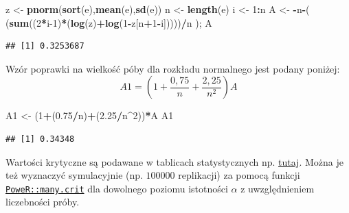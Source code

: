 \documentclass[polish,]{book}
\newenvironment{Shaded}{\begin{snugshade}}{\end{snugshade}}
\newcommand{\DecValTok}[1]{\textcolor[rgb]{0.00,0.00,0.81}{#1}}
\newcommand{\FloatTok}[1]{\textcolor[rgb]{0.00,0.00,0.81}{#1}}
\newcommand{\KeywordTok}[1]{\textcolor[rgb]{0.13,0.29,0.53}{\textbf{#1}}}
\newcommand{\NormalTok}[1]{#1}
\newcommand{\OperatorTok}[1]{\textcolor[rgb]{0.81,0.36,0.00}{\textbf{#1}}}
\newcommand{\StringTok}[1]{\textcolor[rgb]{0.31,0.60,0.02}{#1}}
\begin{document}
\begin{Shaded}
\begin{Highlighting}[]
\NormalTok{z <-}\StringTok{ }\KeywordTok{pnorm}\NormalTok{(}\KeywordTok{sort}\NormalTok{(e),}\KeywordTok{mean}\NormalTok{(e),}\KeywordTok{sd}\NormalTok{(e))}
\NormalTok{n <-}\StringTok{ }\KeywordTok{length}\NormalTok{(e)}
\NormalTok{i <-}\StringTok{ }\DecValTok{1}\OperatorTok{:}\NormalTok{n}
\NormalTok{A <-}\StringTok{ }\OperatorTok{-}\NormalTok{n}\OperatorTok{-}\NormalTok{( (}\KeywordTok{sum}\NormalTok{((}\DecValTok{2}\OperatorTok{*}\NormalTok{i}\DecValTok{-1}\NormalTok{)}\OperatorTok{*}\NormalTok{(}\KeywordTok{log}\NormalTok{(z)}\OperatorTok{+}\KeywordTok{log}\NormalTok{(}\DecValTok{1}\OperatorTok{-}\NormalTok{z[n}\OperatorTok{+}\DecValTok{1}\OperatorTok{-}\NormalTok{i]))))}\OperatorTok{/}\NormalTok{n ); A}
\end{Highlighting}
\end{Shaded}

\begin{verbatim}
## [1] 0.3253687
\end{verbatim}

Wzór poprawki na wielkość póby dla rozkładu normalnego jest podany poniżej:
\begin{equation}
A1=\left(1+\frac{0,75}{n}+\frac{2,25}{n^2}\right)A
\label{eq:wz1311}
\end{equation}

\begin{Shaded}
\begin{Highlighting}[]
\NormalTok{A1 <-}\StringTok{ }\NormalTok{(}\DecValTok{1}\OperatorTok{+}\NormalTok{(}\FloatTok{0.75}\OperatorTok{/}\NormalTok{n)}\OperatorTok{+}\NormalTok{(}\FloatTok{2.25}\OperatorTok{/}\NormalTok{n}\OperatorTok{^}\DecValTok{2}\NormalTok{))}\OperatorTok{*}\NormalTok{A}
\NormalTok{A1}
\end{Highlighting}
\end{Shaded}

\begin{verbatim}
## [1] 0.34348
\end{verbatim}

Wartości krytyczne są podawane w tablicach statystycznych np. \href{https://en.wikipedia.org/wiki/Anderson\%E2\%80\%93Darling_test}{tutaj}. Można je też wyznaczyć symulacyjnie (np. \(100000\) replikacji) za pomocą funkcji \href{https://rdrr.io/cran/PoweR/man/many.crit.html}{\texttt{PoweR::many.crit}} dla dowolnego poziomu istotności \(\alpha\) z uwzględnieniem liczebności próby.
\end{document}
